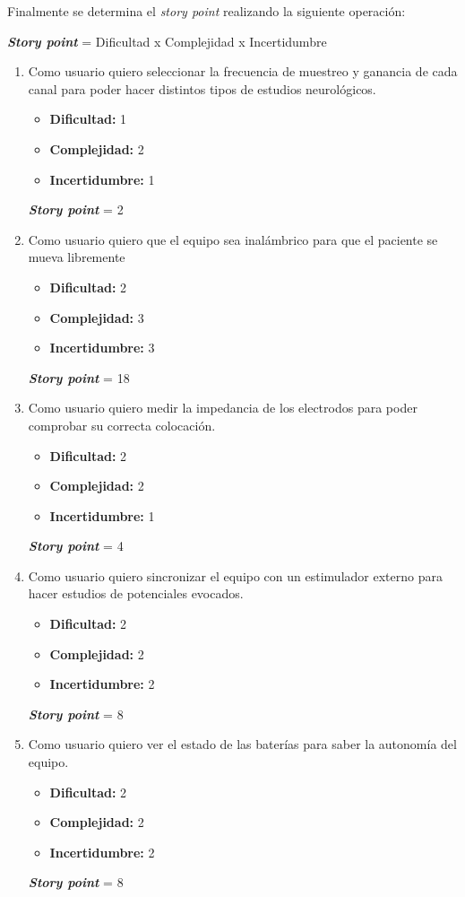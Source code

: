\documentclass[
11pt, %
codirector, %
]{charter}
\begin{document}
Finalmente se determina el \textit{story point} realizando la siguiente operación:

	\textbf{\textit{Story point}} = Dificultad x Complejidad x Incertidumbre

	\begin{enumerate}
		\item Como usuario quiero seleccionar la frecuencia de muestreo y ganancia de cada canal para poder hacer distintos tipos de estudios neurológicos.
		\begin{itemize}
			\item \textbf{Dificultad:} 1
			\item \textbf{Complejidad:} 2
			\item \textbf{Incertidumbre:} 1
		\end{itemize}	
	\textbf{\textit{Story point}} = 2

		\item Como usuario quiero que el equipo sea inalámbrico para que el paciente se mueva libremente
		\begin{itemize}
			\item \textbf{Dificultad:} 2
			\item \textbf{Complejidad:} 3
			\item \textbf{Incertidumbre:} 3
		\end{itemize}	
	\textbf{\textit{Story point}} = 18

		\item Como usuario quiero medir la impedancia de los electrodos para poder comprobar su correcta colocación.
		\begin{itemize}
			\item \textbf{Dificultad:} 2
			\item \textbf{Complejidad:} 2
			\item \textbf{Incertidumbre:} 1
		\end{itemize}	
	\textbf{\textit{Story point}} = 4

		\item Como usuario quiero sincronizar el equipo con un estimulador externo para hacer estudios de potenciales evocados.
		\begin{itemize}
			\item \textbf{Dificultad:} 2
			\item \textbf{Complejidad:} 2
			\item \textbf{Incertidumbre:} 2
		\end{itemize}	
	\textbf{\textit{Story point}} = 8

		\item Como usuario quiero ver el estado de las baterías para saber la autonomía del equipo.
		\begin{itemize}
			\item \textbf{Dificultad:} 2
			\item \textbf{Complejidad:} 2
			\item \textbf{Incertidumbre:} 2
		\end{itemize}	
	\textbf{\textit{Story point}} = 8
	\end{enumerate}
\end{document}
